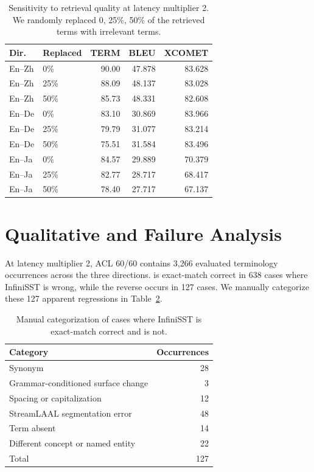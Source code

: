 \begin{table}[t]
\centering
\setlength{\tabcolsep}{2.5pt}
\begin{tabular}{llrrr}
\toprule
Dir. & Replaced & TERM & BLEU & XCOMET \\
\midrule
En--Zh & 0\%  & 90.00 & 47.878 & 83.628 \\
En--Zh & 25\% & 88.09 & 48.137 & 83.028 \\
En--Zh & 50\% & 85.73 & 48.331 & 82.608 \\
\midrule
En--De & 0\%  & 83.10 & 30.869 & 83.966 \\
En--De & 25\% & 79.79 & 31.077 & 83.214 \\
En--De & 50\% & 75.51 & 31.584 & 83.496 \\
\midrule
En--Ja & 0\%  & 84.57 & 29.889 & 70.379 \\
En--Ja & 25\% & 82.77 & 28.717 & 68.417 \\
En--Ja & 50\% & 78.40 & 27.717 & 67.137 \\
\bottomrule
\end{tabular}
\caption{Sensitivity to retrieval quality at latency multiplier 2. We randomly replaced 0, 25\%, 50\% of the retrieved terms with irrelevant terms.}
\label{tab:retrieval_degradation}
\end{table}


\section{\texorpdfstring{{Qualitative and Failure Analysis}}{Qualitative and Failure Analysis}}
\label{sec:qualitative_analysis}

At latency multiplier 2, ACL 60/60 contains 3,266 evaluated terminology occurrences across the three directions. \method is exact-match correct in 638 cases where InfiniSST is wrong, while the reverse occurs in 127 cases. We manually categorize these 127 apparent regressions in Table~\ref{tab:qualitative_errors}.

\begin{table}[t]
\centering
\small
\begin{tabular}{lr}
\toprule
Category & Occurrences \\
\midrule
Synonym & 28 \\
Grammar-conditioned surface change & 3 \\
Spacing or capitalization & 12 \\
StreamLAAL segmentation error & 48 \\
Term absent & 14 \\
Different concept or named entity & 22 \\
\midrule
Total & 127 \\
\bottomrule
\end{tabular}
\caption{Manual categorization of cases where InfiniSST is exact-match correct and \method is not.}
\label{tab:qualitative_errors}
\end{table}

